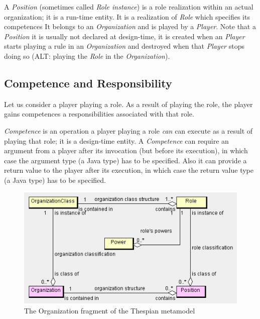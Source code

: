 A \textit{Position} (sometimes called \textit{Role instance}) is a role realization within an actual organization; it is a run-time entity.
It is a realization of \textit{Role} which specifies its competences
It belongs to an \textit{Organization} and is played by a \textit{Player}.
Note that a \textit{Position} it is usually not declared at design-time, it is created when an \textit{Player} starts playing a rule in an \textit{Organization} and destroyed when that \textit{Player} stops doing so (ALT: playing the \textit{Role} in the \textit{Organization}).

\subsection*{Competence and Responsibility}

Let us consider a player playing a role.
As a result of playing the role, the player gains competences a responsibilities associated with that role.

\textit{Competence} is an operation a player playing a role \textit{can} can execute as a result of playing that role; it is a design-time entity.
A \textit{Competence} can require an argument from a player after its invocation (but before its execution), in which case the argument type (a Java type) has to be specified.
Also it can provide a return value to the player after its execution, in which case the return value type (a Java type) has to be specified.

\begin{figure}[ht]
	\centering
	\includegraphics[width=\textwidth]{images/thespian-organization-metamodel.png}
	\caption{The Organization fragment of the Thespian metamodel}
	\label{figure:thespian-organization-metamodel}
\end{figure}

